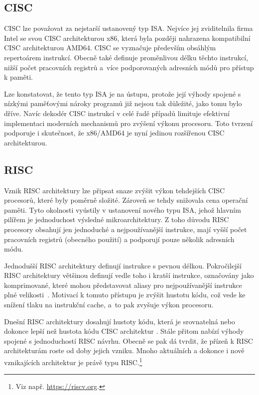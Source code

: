 \documentclass[
  digital, %
  color,   %
  table,   %
  twoside, %
  nolof,   %
  nolot,   %
]{fithesis3}
\begin{document}
\subsection{CISC}
CISC lze považovat za nejstarší ustanovený typ ISA. Nejvíce jej zviditelnila firma Intel se svou CISC architekturou x86, která byla později nahrazena kompatibilní CISC architekturou AMD64. CISC se vyznačuje především obsáhlým repertoárem instrukcí. Obecně také definuje proměnlivou délku těchto instrukcí, nižší počet pracovních registrů a~více podporovaných adresních módů pro přístup k paměti.

Lze konstatovat, že tento typ ISA je na ústupu, protože její výhody spojené s nízkými paměťovými nároky programů již nejsou tak důležité, jako tomu bylo dříve. Navíc dekodér CISC instrukcí v celé řadě případů limituje efektivní implementaci moderních mechanismů pro zvýšení výkonu procesoru. Toto tvrzení podporuje i skutečnost, že x86/AMD64 je nyní jedinou rozšířenou CISC architekturou.

\subsection{RISC}
Vznik RISC architektury lze připsat snaze zvýšit výkon tehdejších CISC procesorů, které byly poměrně složité. Zároveň se tehdy snižovala cena operační paměti. Tyto okolnosti vyústily v ustanovení nového typu ISA, jehož hlavním pilířem je jednoduchost výsledné mikroarchitektury. Z toho důvodu RISC procesory obsahují jen jednoduché a nejpoužívanější instrukce, mají vyšší počet pracovních registrů (obecného použití) a podporují pouze několik adresních módu.

Jednodušší RISC architektury definují instrukce s pevnou délkou. Pokročilejší RISC architektury většinou definují vedle toho i kratší instrukce, označovány jako komprimované, které mohou představovat aliasy pro nejpoužívanější instrukce plné velikosti~\mbox{\parencite[97--113]{waterman19}}. Motivací k tomuto přístupu je zvýšit hustotu kódu, což vede ke snížení tlaku na instrukční cache, a~to pak zvyšuje výkon procesoru.

Dnešní RISC architektury dosahují hustoty kódu, která je srovnatelná nebo dokonce lepší než hustota kódu CISC architektur \parencite{waterman15}. Stále přitom nabízí výhody spojené s jednoduchostí RISC návrhu. Obecně se pak dá tvrdit, že přízeň k RISC architekturám roste od doby jejich vzniku. Mnoho aktuálních a dokonce i nově vznikajících architektur je právě typu RISC.\footnote{Viz např. \url{https://riscv.org}.}
\end{document}
